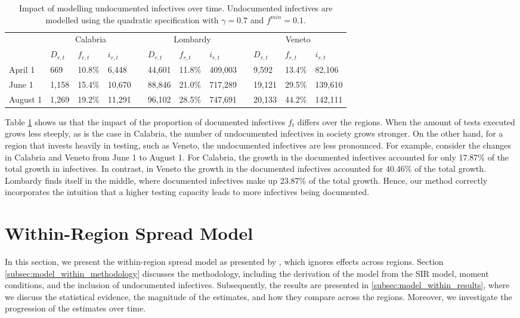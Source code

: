 \documentclass[12pt]{article}
\begin{document}
	\begin{table}[H]
		\centering
		\caption{Impact of modelling undocumented infectives over time. Undocumented infectives are modelled using the quadratic specification with $\gamma = 0.7$ and $f^{min}=0.1$.}
		\label{tab:f_t_over_time}
		\begin{tabular}{llllllllllll}
		    \toprule 
                     & \multicolumn{3}{c}{Calabria} && \multicolumn{3}{c}{Lombardy} && \multicolumn{3}{c}{Veneto} \\
                     \cmidrule{2-4}\cmidrule{6-8}\cmidrule{10-12}
                     & $D_{r,t}$  & $f_{r,t}$   & $i_{r,t}$   && $D_{r,t}$  & $f_{r,t}$   & $i_{r,t}$    && $D_{r,t}$  & $f_{r,t}$  & $i_{r,t}$   \\ \midrule
            April 1  & 669     & 10.8\%  & 6,448   && 44,601  & 11.8\%  & 409,003  && 9,592   & 13.4\% & 82,106  \\
            June 1   & 1,158   & 15.4\%  & 10,670  && 88,846  & 21.0\%  & 717,289  && 19,121  & 29.5\% & 139,610 \\
            August 1 & 1,269   & 19.2\%  & 11,291  && 96,102  & 28.5\%  & 747,691  && 20,133  & 44.2\% & 142,111 \\ \bottomrule
        \end{tabular}
	\end{table}
	
	Table \ref{tab:f_t_over_time} shows us that the impact of the proportion of documented infectives $f_t$ differs over the regions. When the amount of tests executed grows less steeply, as is the case in Calabria, the number of undocumented infectives in society grows stronger. On the other hand, for a region that invests heavily in testing, such as Veneto, the undocumented infectives are less pronounced. For example, consider the changes in Calabria and Veneto from June 1 to August 1. For Calabria, the growth in the documented infectives accounted for only 17.87\% of the total growth in infectives. In contrast, in Veneto the growth in the documented infectives accounted for 40.46\% of the total growth. Lombardy finds itself in the middle, where documented infectives make up 23.87\% of the total growth. Hence, our method correctly incorporates the intuition that a higher testing capacity leads to more infectives being documented.
	
	\section{Within-Region Spread Model} \label{sec:model_within}
	In this section, we present the within-region spread model as presented by \textcite{adda2016economic}, which ignores effects across regions. Section \ref{subsec:model_within_methodology} discusses the methodology, including the derivation of the model from the SIR model, moment conditions, and the inclusion of undocumented infectives. Subsequently, the results are presented in \ref{subsec:model_within_results}, where we discuss the statistical evidence, the magnitude of the estimates, and how they compare across the regions. Moreover, we investigate the progression of the estimates over time.
	
\end{document}

